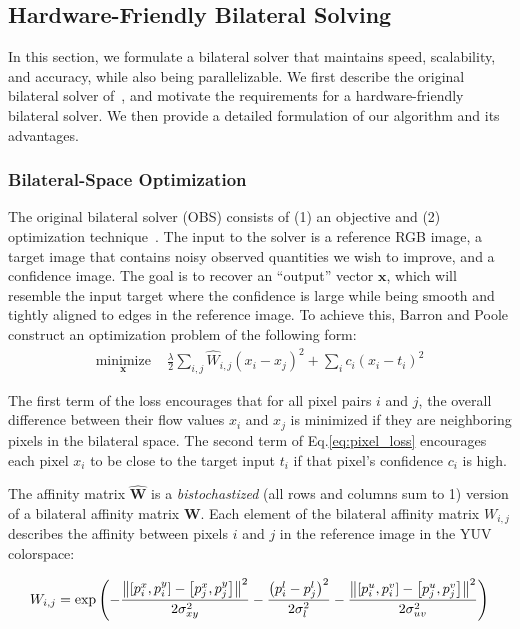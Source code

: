\subsection{Hardware-Friendly Bilateral Solving}
\label{sec:solver}

In this section, we formulate a bilateral solver that maintains speed, scalability, and accuracy, while also being parallelizable.
We first describe the original bilateral solver of~\cite{BarronPoole2016}, and motivate the requirements for a hardware-friendly bilateral solver. We then provide a detailed formulation of our algorithm and its advantages.

\subsubsection{Bilateral-Space Optimization}
The original bilateral solver (OBS) consists of (1) an objective and (2) optimization technique~\cite{BarronPoole2016}.
The input to the solver is a reference RGB image, a target image that contains noisy observed quantities we wish to improve, and a confidence image.
The goal is to recover an ``output'' vector $\mathbf{x}$, which will resemble the input target where the confidence is large while being smooth and tightly aligned to edges in the reference image.
To achieve this, Barron and Poole construct an optimization problem of the following form:
\begin{align}
  \underset{\mathbf{x}}{\mathrm{minimize}} &\,\, \frac{\lambda}{2} \sum_{i, j} \hat W_{i,j} \left(x_i - x_j \right)^2  + \sum_i c_i (x_i - t_i)^2
\label{eq:pixel_loss}
\end{align}

The first term of the loss encourages that for all pixel pairs $i$ and $j$, the overall difference between their flow values $x_i$ and $x_j$ is minimized if they are neighboring pixels in the bilateral space.
The second term of Eq.\ref{eq:pixel_loss} encourages each pixel $x_i$ to be close to the target input $t_i$ if that pixel's confidence $c_i$ is high.

The affinity matrix $\mathbf{\hat W}$ is a \emph{bistochastized} (all rows and columns sum to 1) version of a bilateral affinity matrix $\mathbf{W}$.
Each element of the bilateral affinity matrix $W_{i, j}$ describes the affinity between pixels $i$ and $j$ in the reference image in the YUV colorspace:

\begin{align}
W_{i,j} = \exp\left( - { \frac{ \norm*{ \left[ p^x_i, p^y_i \right] - \left[ p^x_j, p^y_j \right] }^2 } { 2 \sigma_{xy}^2 } } -  { \frac{ \left( p^l_i - p^l_j \right)^2 }{ 2 \sigma_{l}^2 } } -  { \frac{\norm*{ \left[ p^u_i, p^v_i \right] - \left[p^u_j, p^v_j \right] }^2 }{ 2 \sigma_{uv}^2 }} \right)
\label{eq:bilateral_affinity}
\end{align}

